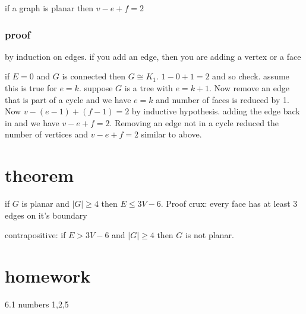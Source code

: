\documentclass[letterpaper]{article}
\begin{document}
if a graph is planar then $v-e+f=2$

\subsubsection*{proof}
by induction on edges. if you add an edge, then you are adding a vertex or a face

if $E=0$ and $G$ is connected then $G\cong K_1$. $1-0+1=2$ and so check. assume this is true for $e=k$. suppose $G$ is a tree with $e=k+1$. Now remove an edge that is part of a cycle and we have $e=k$ and number of faces is reduced by 1. Now $v-(e-1)+(f-1)=2$ by inductive hypothesis. adding the edge back in and we have $v-e+f=2$. Removing an edge not in a cycle reduced the number of vertices and $v-e+f=2$ similar to above.

\section*{theorem}
if $G$ is planar and $|G|\ge  4$ then $E\le 3V-6$. Proof crux: every face has at least 3 edges on it's boundary

contrapositive:
if $E>3V-6$ and $|G|\ge 4$ then $G$ is not planar.

\section*{homework}
6.1 numbers 1,2,5
\end{document}
